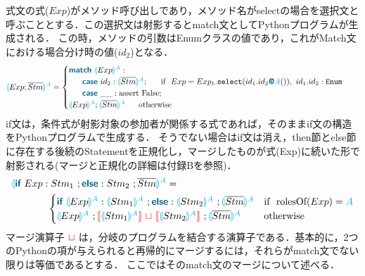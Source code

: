 \documentclass{thesis}
\newcommand{\projection}[2]{{\color{cyan}\llparenthesis}#1{\color{cyan}\rrparenthesis^#2}}
\newcommand{\mblue}[1]{\textbf{\textsf{\color{MidnightBlue}#1}}}
\newcommand{\cyan}[1]{\color{cyan}#1}
\newcommand{\nl}[1]{{\color{red}{\llbracket}}#1{\color{red}{\rrbracket}}} %
\newcommand{\mg}{~{\color{red}{\sqcup}}~} %
\begin{document}
式文の式($Exp$)がメソッド呼び出しであり，メソッド名が\textsf{select}の場合を選択文と呼ぶこととする．この選択文は射影するとmatch文としてPythonプログラムが生成される．
この時，メソッドの引数はEnumクラスの値であり，これがMatch文における場合分け時の値($id_2$)となる．
\begin{alignat*}{2} 
  &\projection{Exp;\overline{Stm}}{A} =
  \begin{cases}
    \mblue{match} ~\projection{Exp}{A}: \\
    ~~~~~\mblue{case} ~id_2: \projection{\overline{Stm}}{A};~~~~~ \text{if}~~Exp = Exp_1.\texttt{select}(id_1.id_2\mblue{@}{\cyan{A}}()),~ id_1.id_2:\texttt{Enum}\\ %
    ~~~~~\mblue{case} ~\_\_: \text{assert False}; \\
    \projection{Exp}{A};\projection{\overline{Stm}}{A} ~~~~~ \text{otherwise}\\
  \end{cases}
\end{alignat*}
if文は，条件式が射影対象の参加者が関係する式であれば，そのままif文の構造をPythonプログラムで生成する．
そうでない場合はif文は消え，then節とelse節に存在する後続のStatementを正規化し，マージしたものが式(Exp)に続いた形で射影される(マージと正規化の詳細は付録Bを参照)．
\begin{alignat*}{2} 
  &\projection{\mblue{if}~Exp:Stm_1~;\mblue{else}:Stm_2 ~;\overline{Stm}}{A}=\\
  &
  ~~~~~~~~~~~\begin{cases}
    \mblue{if}~\projection{Exp}{A} : \projection{Stm_1}{A} ~; \mblue{else}:\projection{Stm_2}{A} ~;\projection{\overline{Stm}}{A} & \text{if}~~ \text{rolesOf}(Exp) = \cyan{A}\\
    \projection{Exp}{A} ~; \nl{\projection{Stm_1}{A}} \mg \nl{\projection{Stm_2}{A}} ~;\projection{\overline{Stm}}{A} & \text{otherwise}
  \end{cases}\\
\end{alignat*}
マージ演算子$\mg$は，分岐のプログラムを結合する演算子である．基本的に，2つのPythonの項が与えられると再帰的にマージするには，それらがmatch文でない限りは等価であるとする．
ここではそのmatch文のマージについて述べる．
\end{document}
